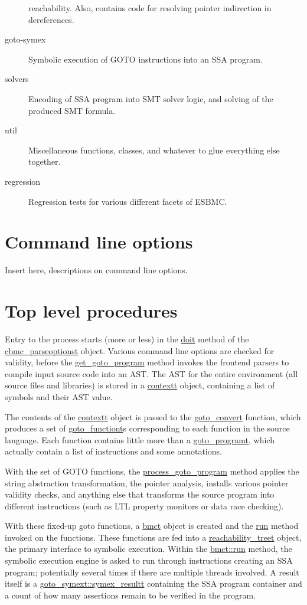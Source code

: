 \documentclass{article}
\begin{document}
\begin{description}
                        reachability. Also, contains code for resolving pointer
                        indirection in dereferences.
\item[goto-symex] Symbolic execution of GOTO instructions into an SSA program.
\item[solvers] Encoding of SSA program into SMT solver logic, and solving of
               the produced SMT formula.
\item[util] Miscellaneous functions, classes, and whatever to glue everything
            else together.
\item[regression] Regression tests for various different facets of ESBMC.
\end{description}

\section{Command line options}

Insert here, descriptions on command line options.

\section{Top level procedures}

Entry to the process starts (more or less) in the \url{doit} method of the
\url{cbmc_parseoptionst} object. Various command line options are checked
for validity, before the \url{get_goto_program} method invokes the
frontend parsers to compile input source code into an AST. The AST for the
entire environment (all source files and libraries) is stored in a
\url{contextt} object, containing a list of symbols and their AST value.

The contents of the \url{contextt} object is passed to the
\url{goto_convert} function, which produces a set of
\url{goto_functiont}s corresponding to each function in the source language.
Each function contains little more than a \url{goto_programt}, which
actually contain a list of instructions and some annotations.

With the set of GOTO functions, the \url{process_goto_program} method
applies the string abstraction transformation, the pointer analysis,
installs various pointer validity checks, and anything else that transforms
the source program into different instructions (such as LTL property monitors
or data race checking).

With these fixed-up goto functions, a \url{bmct} object is created and the
\url{run} method invoked on the functions. These functions are fed into a
\url{reachability_treet} object, the primary interface to symbolic
execution. Within the \url{bmct::run} method, the symbolic execution engine
is asked to run through instructions creating an SSA program; potentially
several times if there are multiple threads involved. A result itself is a
\url{goto_symext::symex_resultt} containing the SSA program container and
a count of how many assertions remain to be verified in the program.
\end{document}

